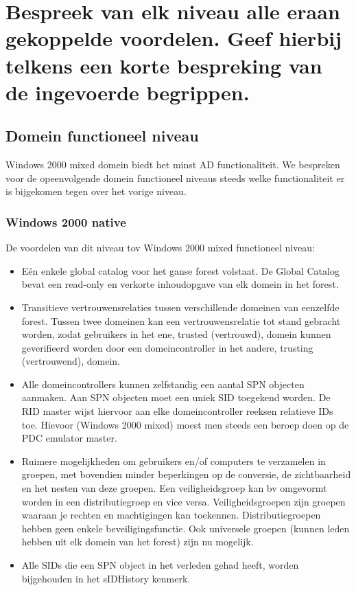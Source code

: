 \section{Bespreek van elk niveau alle eraan gekoppelde voordelen. Geef hierbij
telkens een korte bespreking van de ingevoerde begrippen.}

\subsection{Domein functioneel niveau}

Windows 2000 mixed domein biedt het minst AD functionaliteit. We bespreken voor
de opeenvolgende domein functioneel niveaus steeds welke functionaliteit er is
bijgekomen tegen over het vorige niveau.

\subsubsection{Windows 2000 native}

De voordelen van dit niveau tov Windows 2000 mixed functioneel niveau:
\begin{itemize}
	\item Eén enkele global catalog voor het ganse forest volstaat. De
		Global Catalog bevat een read-only en verkorte inhoudopgave van
		elk domein in het forest.
	\item Transitieve vertrouwensrelaties tussen verschillende domeinen van
		eenzelfde forest. Tussen twee domeinen kan een
		vertrouwensrelatie tot stand gebracht worden, zodat gebruikers
		in het ene, trusted (vertrouwd), domein kunnen geverifieerd
		worden door een domeincontroller in het andere, trusting
		(vertrouwend), domein.
	\item Alle domeincontrollers kunnen zelfstandig een aantal SPN objecten
		aanmaken. Aan SPN objecten moet een uniek SID toegekend worden.
		De RID master wijst hiervoor aan elke domeincontroller reeksen
		relatieve IDs toe. Hievoor (Windows 2000 mixed) moest men steeds
		een beroep doen op de PDC emulator master.
	\item Ruimere mogelijkheden om gebruikers en/of computers te verzamelen
		in groepen, met bovendien minder beperkingen op de conversie, de
		zichtbaarheid en het nesten van deze groepen. Een
		veiligheidsgroep kan bv omgevormt worden in een distributiegroep
		en vice versa. Veiligheidsgroepen zijn groepen waaraan je
		rechten en machtigingen kan toekennen. Distributiegroepen hebben
		geen enkele beveiligingsfunctie. Ook universele groepen (kunnen
		leden hebben uit elk domein van het forest) zijn nu mogelijk.
	\item Alle SIDs die een SPN object in het verleden gehad heeft, worden
		bijgehouden in het sIDHistory kenmerk.
\end{itemize}

